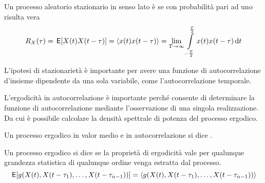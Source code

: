 \begin{definizione}
Un processo aleatorio stazionario in senso lato è  se con probabilità pari ad uno risulta vera
\begin{equation}
R_X(\tau)=\,{\operatorname{\mathsf{E}}}\!\left[{X(t)X(t-\tau)}\right]=\langle x(t)x(t-\tau)\rangle=\lim\limits_{T\to\infty}\int\limits_{-\frac{T}{2}}^{\frac{T}{2}}{x(t)x(t-\tau)}{\,\mathop{}\!\mathrm{d}{t}}
\end{equation}
\end{definizione}
L'ipotesi di stazionarietà è importante per avere una funzione di autocorrelazione d'insieme dipendente da una sola variabile, come l'autocorrelazione temporale.

L'ergodicità in autocorrelazione è importante perché consente di determinare la funzione di autocorrelazione mediante l'osservazione di una singola realizzazione. Da cui è possibile calcolare la densità spettrale di potenza del processo ergodico.

\begin{definizione}
Un processo ergodico in valor medio e in autocorrelazione si dice .
\end{definizione}


\begin{definizione}
Un processo ergodico si dice  se la proprietà di ergodicità vale per qualunque grandezza statistica di qualunque ordine venga estratta dal processo.
\[\,{\operatorname{\mathsf{E}}}\!\left[{g(X(t),X(t-\tau_1),\dots,X(t-\tau_{n-1}))}\right]=\langle g(X(t),X(t-\tau_1),\dots,X(t-\tau_{n-1}))\rangle\]
\end{definizione}

